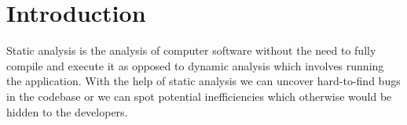 \section{Introduction}

Static analysis is the analysis of computer software without the need to fully compile and execute it as opposed to dynamic analysis\cite{dynamic_analysis} which involves running the application. With the help of static analysis we can uncover hard-to-find bugs in the codebase or we can spot potential inefficiencies which otherwise would be hidden to the developers.